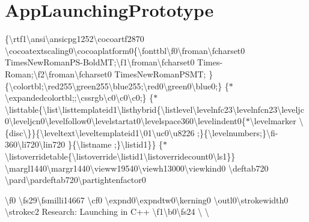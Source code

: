 \chapter{App\+Launching\+Prototype }
\hypertarget{md__2shr_2Github_2WheelTime_2notes_2AppLaunchingPrototype}{}\label{md__2shr_2Github_2WheelTime_2notes_2AppLaunchingPrototype}
\{\textbackslash{}rtf1\textbackslash{}ansi\textbackslash{}ansicpg1252\textbackslash{}cocoartf2870 \textbackslash{}cocoatextscaling0\textbackslash{}cocoaplatform0\{\textbackslash{}fonttbl\textbackslash{}f0\textbackslash{}froman\textbackslash{}fcharset0 Times\+New\+Roman\+PS-\/\+Bold\+MT;\textbackslash{}f1\textbackslash{}froman\textbackslash{}fcharset0 Times-\/\+Roman;\textbackslash{}f2\textbackslash{}froman\textbackslash{}fcharset0 Times\+New\+Roman\+PSMT; \} \{\textbackslash{}colortbl;\textbackslash{}red255\textbackslash{}green255\textbackslash{}blue255;\textbackslash{}red0\textbackslash{}green0\textbackslash{}blue0;\} \{\texorpdfstring{$\ast$}{*}\textbackslash{}expandedcolortbl;;\textbackslash{}cssrgb\textbackslash{}c0\textbackslash{}c0\textbackslash{}c0;\} \{\texorpdfstring{$\ast$}{*}\textbackslash{}listtable\{\textbackslash{}list\textbackslash{}listtemplateid1\textbackslash{}listhybrid\{\textbackslash{}listlevel\textbackslash{}levelnfc23\textbackslash{}levelnfcn23\textbackslash{}leveljc0\textbackslash{}leveljcn0\textbackslash{}levelfollow0\textbackslash{}levelstartat0\textbackslash{}levelspace360\textbackslash{}levelindent0\{\texorpdfstring{$\ast$}{*}\textbackslash{}levelmarker \textbackslash{}\{disc\textbackslash{}\}\}\{\textbackslash{}leveltext\textbackslash{}leveltemplateid1\textbackslash{}\textquotesingle{}01\textbackslash{}uc0\textbackslash{}u8226 ;\}\{\textbackslash{}levelnumbers;\}\textbackslash{}fi-\/360\textbackslash{}li720\textbackslash{}lin720 \}\{\textbackslash{}listname ;\}\textbackslash{}listid1\}\} \{\texorpdfstring{$\ast$}{*}\textbackslash{}listoverridetable\{\textbackslash{}listoverride\textbackslash{}listid1\textbackslash{}listoverridecount0\textbackslash{}ls1\}\} \textbackslash{}margl1440\textbackslash{}margr1440\textbackslash{}vieww19540\textbackslash{}viewh13000\textbackslash{}viewkind0 \textbackslash{}deftab720 \textbackslash{}pard\textbackslash{}pardeftab720\textbackslash{}partightenfactor0

\textbackslash{}f0{\bfseries{}} \textbackslash{}fs29\textbackslash{}fsmilli14667 \textbackslash{}cf0 \textbackslash{}expnd0\textbackslash{}expndtw0\textbackslash{}kerning0 \textbackslash{}outl0\textbackslash{}strokewidth0 \textbackslash{}strokec2 Research:\+  Launching in C++ \textbackslash{}f1\textbackslash{}b0\textbackslash{}fs24 \textbackslash{} \textbackslash{}

